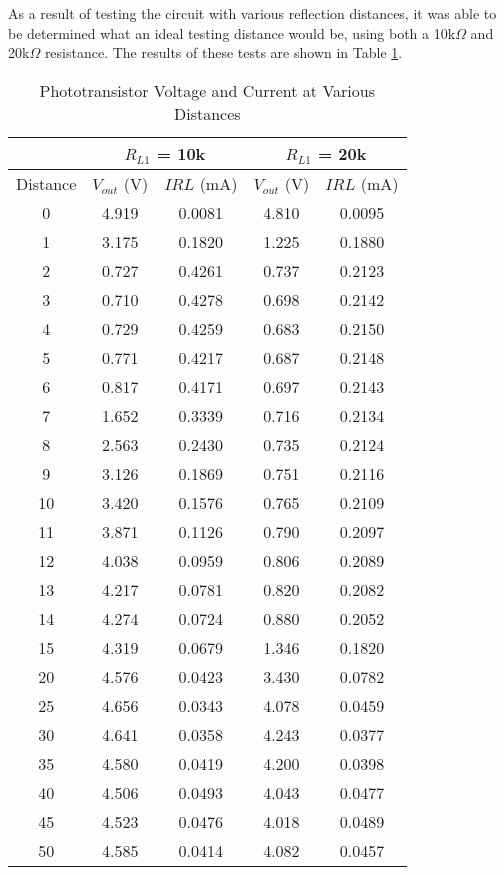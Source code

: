 \documentclass[conference]{IEEEtran}
\begin{document}
As a result of testing the circuit with various reflection distances, it was able to be
determined what an ideal testing distance would be, using both a 10k$\Omega$ and 20k$\Omega$ resistance. 
The results of these tests are shown in Table \ref{distanceVoltageCurrent}.

\begin{table}[H]
    \centering
    \caption{Phototransistor Voltage and Current at Various Distances}
    \label{distanceVoltageCurrent}
    \begin{tabular}{|c||c|c||c|c|}
        \hline
         & \multicolumn{2}{c||}{$R_{L1}$ = \textbf{10k}} & \multicolumn{2}{c|}{$R_{L1}$ = \textbf{20k}} \\
        \hline
        Distance & $V_{out}$ (V) & $IRL$ (mA) & $V_{out}$ (V) & $IRL$ (mA) \\
        \hline
        0 &  4.919 &  0.0081 & 4.810 & 0.0095 \\
        1 &  3.175 &  0.1820 & 1.225 & 0.1880 \\
        2 &  0.727 &  0.4261 & 0.737 & 0.2123 \\
        3 &  0.710 &  0.4278 & 0.698 & 0.2142 \\
        4 &  0.729 &  0.4259 & 0.683 & 0.2150 \\
        5 &  0.771 &  0.4217 & 0.687 & 0.2148 \\
        6 &  0.817 &  0.4171 & 0.697 & 0.2143 \\
        7 &  1.652 &  0.3339 & 0.716 & 0.2134 \\
        8 &  2.563 &  0.2430 & 0.735 & 0.2124 \\
        9 &  3.126 &  0.1869 & 0.751 & 0.2116 \\
        10 & 3.420 &  0.1576 & 0.765 & 0.2109 \\
        11 & 3.871 &  0.1126 & 0.790 & 0.2097 \\
        12 & 4.038 &  0.0959 & 0.806 & 0.2089 \\
        13 & 4.217 &  0.0781 & 0.820 & 0.2082 \\
        14 & 4.274 &  0.0724 & 0.880 & 0.2052 \\
        15 & 4.319 &  0.0679 & 1.346 & 0.1820 \\
        20 & 4.576 &  0.0423 & 3.430 & 0.0782 \\
        25 & 4.656 &  0.0343 & 4.078 & 0.0459 \\
        30 & 4.641 &  0.0358 & 4.243 & 0.0377 \\
        35 & 4.580 &  0.0419 & 4.200 & 0.0398 \\
        40 & 4.506 &  0.0493 & 4.043 & 0.0477 \\
        45 & 4.523 &  0.0476 & 4.018 & 0.0489 \\
        50 & 4.585 &  0.0414 & 4.082 & 0.0457 \\
        \hline
    \end{tabular}
\end{table}
\end{document}
